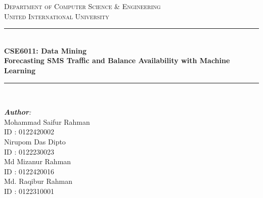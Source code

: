 \documentclass[12pt]{book} %
\begin{document}
\begin{titlepage}

\newcommand{\HRule}{\rule{\linewidth}{0.5mm}} %
\center %
 

\textsc{\Large Department of Computer Science \& Engineering}\\[0.5cm] %
\textsc{\Huge United International University}\\[1cm] %


\HRule \\[0.4cm]
{ \huge \LARGE \textbf{CSE6011: Data Mining}}\\ [0.4cm] %
{ {\Large \textbf{Forecasting SMS Traffic and Balance Availability with Machine Learning}}}\\
\HRule \\ [1cm]


\begin{minipage}{0.5\textwidth}
\begin{flushleft} \small
\emph{\textbf{\large Author}:}\\
Mohammad Saifur Rahman  \\ %
ID : 0122420002\\
Nirupom Das Dipto  \\ %
ID : 0122230023\\
Md Mizanur Rahman \\ %
ID : 0122420016\\
Md. Raqibur Rahman  \\ %
ID : 0122310001\\


\end{flushleft}
\end{minipage}
\end{titlepage}
\end{document}
